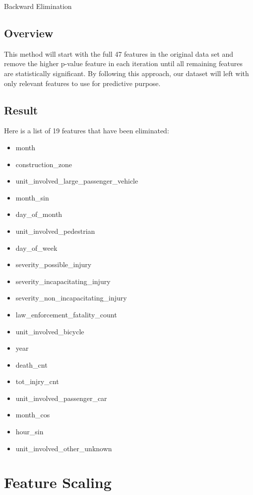 \documentclass[conference]{IEEEtran}
\begin{document}
\begin{center}
    {Backward Elimination}
\end{center}
\subsection*{Overview}
This method will start with the full 47 features in the original data set and remove the higher p-value feature in each iteration until all remaining features are statistically significant.  By following this approach, our dataset will left with only relevant features to use for predictive purpose. 

\subsection*{Result}
Here is a list of 19 features that have been eliminated: 

\begin{itemize}
    \item {month}
    \item {construction\_zone}
    \item {unit\_involved\_large\_passenger\_vehicle}
    \item {month\_sin}
    \item {day\_of\_month}
    \item {unit\_involved\_pedestrian}
    \item {day\_of\_week}
    \item {severity\_possible\_injury}
    \item {severity\_incapacitating\_injury}
    \item {severity\_non\_incapacitating\_injury}
    \item {law\_enforcement\_fatality\_count}
    \item {unit\_involved\_bicycle}
    \item {year}
    \item {death\_cnt}
    \item {tot\_injry\_cnt}
    \item {unit\_involved\_passenger\_car}
    \item {month\_cos}
    \item {hour\_sin}
    \item {unit\_involved\_other\_unknown}
\end{itemize}

\section{Feature Scaling}
\end{document}
